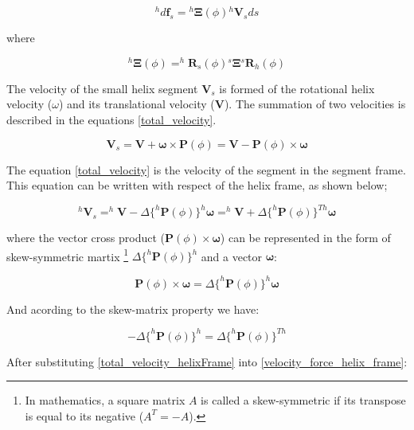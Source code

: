 \documentclass[12pt,a4paper,titlepage]{report}
\begin{document}
\begin{equation}
 ^{h}d\bm{f}_s = {^{h}\bm{\Xi}}(\phi){^{h}\bm{V}_s}{ds}
\label{velocity_force_helix_frame}
\end{equation}

where


\begin{equation}
{^{h}\bm{\Xi}}(\phi) = ^{h}\bm{R}_s(\phi){^{s}\bm{\Xi}}{^{s}\bm{R}_h(\phi)}
\label{drag_coeff_matrix_rotated}
\end{equation}

The velocity of the small helix segment $\bm{V}_s$ is formed of the rotational helix velocity ($\omega$) 
and its translational velocity ($\bm{V}$). The summation of two velocities is described in the equations
\ref{total_velocity}.

\begin{equation}
\bm{V}_s = \bm{V} + \bm{\omega} \times {\bm{P}(\phi)} = \bm{V} - {\bm{P}(\phi)}\times{\bm{\omega}}
\label{total_velocity}
\end{equation}

The equation \ref{total_velocity} is the velocity of the segment in the segment frame. 
This equation can be written with respect of the helix frame, as shown below;

\begin{equation}
^{h}\bm{V}_s = ^{h}\bm{V} - \Delta{\{^{h}\bm{P}(\phi)}\}^{h}\bm{\omega} = ^{h}\bm{V} + \Delta{\{^{h}\bm{P}(\phi)}\}^{Th}\bm{\omega}
\label{total_velocity_helixFrame}
\end{equation}

where the vector cross product (${\bm{P}(\phi)}\times{\bm{\omega}}$) can be represented in the form 
of skew-symmetric
martix \footnote{In mathematics, a square matrix $A$ is called a skew-symmetric if its transpose
is equal to its negative ($A^{T} = -A$).} $\Delta{\{^{h}\bm{P}(\phi)}\}^{h}$ and a vector
$\bm{\omega}$:

\begin{equation}
{\bm{P}(\phi)}\times{\bm{\omega}} = \Delta{\{^{h}\bm{P}(\phi)}\}^{h}{\bm{\omega}}
\label{cross_product}
\end{equation}

And acording to the skew-matrix property we have:

\begin{equation}
-\Delta{\{^{h}\bm{P}(\phi)}\}^{h} = \Delta{\{^{h}\bm{P}(\phi)}\}^{Th}
\label{skew_symetric_vector}
\end{equation}

After substituting \ref{total_velocity_helixFrame} into \ref{velocity_force_helix_frame}:
\end{document}
